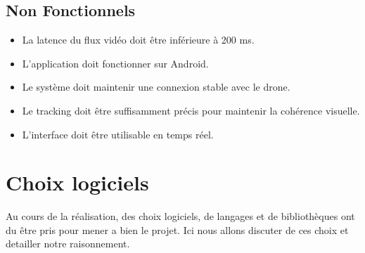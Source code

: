 \documentclass{article}
\begin{document}
\subsection{Non Fonctionnels}
\begin{itemize}
    \item La latence du flux vidéo doit être inférieure à 200 ms.
    \item L’application doit fonctionner sur Android.
    \item Le système doit maintenir une connexion stable avec le drone.
    \item Le tracking doit être suffisamment précis pour maintenir la cohérence visuelle.
    \item L’interface doit être utilisable en temps réel.
\end{itemize}

\section{Choix logiciels}
Au cours de la r\'ealisation, des choix logiciels, de langages et de
biblioth\`eques ont du \^etre pris pour mener a bien le projet. Ici nous allons
discuter de ces choix et detailler notre raisonnement.
\end{document}
